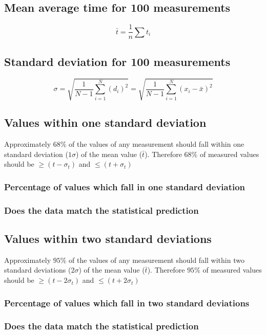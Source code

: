 \documentclass[11pt, letterpaper, includehead]{article}
\begin{document}
  \setcounter{subsection}{3} %
  \subsection{Mean average time for 100 measurements} %

  $$\bar{t} = \frac{1}{n}\sum t_i$$

  \subsection{Standard deviation for 100 measurements} %

  $$\sigma = \sqrt{\frac{1}{N - 1}\sum_{i = 1}^{N} (d_i)^2} = \sqrt{\frac{1}{N - 1}\sum_{i = 1}^{N} (x_i - \bar{x})^2}$$

  \subsection{Values within one standard deviation} %
  Approximately $68\%$ of the values of any measurement should fall within one 
  standard deviation ($1 \sigma$) of the mean value ($\bar{t}$). Therefore $68\%$ of measured 
  values should be $\geq (t - \sigma_t)$ and $\leq (t + \sigma_t)$

  \subsubsection{Percentage of values which fall in one standard deviation}

  \subsubsection{Does the data match the statistical prediction}

  \subsection{Values within two standard deviations} %
  Approximately $95\%$ of the values of any measurement should fall within two 
  standard deviations ($2 \sigma$) of the mean value ($\bar{t}$). Therefore $95\%$ of measured 
  values should be $\geq (t - 2 \sigma_t)$ and $\leq (t + 2 \sigma_t)$

  \subsubsection{Percentage of values which fall in two standard deviations}

  \subsubsection{Does the data match the statistical prediction}
\end{document}
